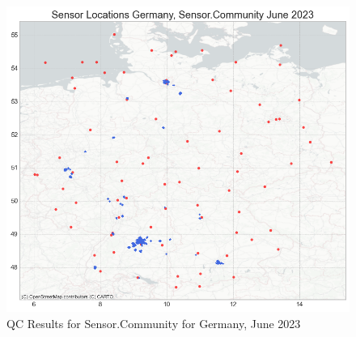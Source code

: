 \begin{figure}[ht]
    \centering
    \includegraphics[width=1\textwidth]{images/sensor_community_locations_germany_after_qc_june_23.png}
    \caption{QC Results for Sensor.Community for Germany, June 2023}
    \label{fig:qc sensor community germany june 23}
\end{figure}

